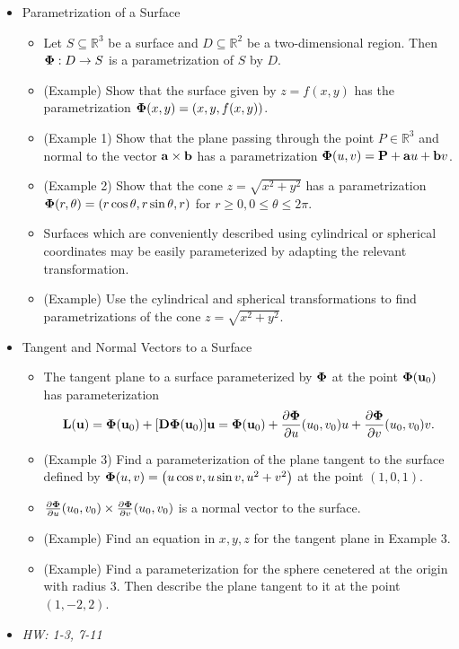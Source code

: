 \documentclass[11pt]{article}
\begin{document}
\begin{itemize}
  \item Parametrization of a Surface
    \begin{itemize}
      \item Let \(S\subseteq \mathbb R^3\) be a surface and
            \(D\subseteq \mathbb R^2\)
            be a two-dimensional region. Then \(\mathbf{\Phi}:D\to S\) is a parametrization
            of \(S\) by \(D\).
      \item (Example) Show that the surface given by \(z=f(x,y)\)
            has the parametrization \(\mathbf{\Phi}(x,y)=\left(x,y,f(x,y)\right)\).
      \item (Example 1) Show that the plane passing through the point
            \(P\in\mathbb R^3\)
            and normal to the vector \(\mathbf{a}\times\mathbf{b}\) has a parametrization
            \(\mathbf{\Phi}(u,v)=\mathbf{P}+\mathbf{a}u+\mathbf{b}v\).
      \item (Example 2) Show that the cone \(z=\sqrt{x^2+y^2}\) has a
            parametrization \(\mathbf{\Phi}(r,\theta)=\left(r\cos\theta,r\sin\theta,r\right)\)
            for \(r\geq 0,0\leq\theta\leq2\pi\).
      \item Surfaces which are conveniently described using cylindrical
            or spherical coordinates may be easily parameterized by adapting
            the relevant transformation.
      \item (Example) Use the cylindrical and spherical transformations to
            find parametrizations of the cone \(z=\sqrt{x^2+y^2}\).
    \end{itemize}
  \item Tangent and Normal Vectors to a Surface
    \begin{itemize}
      \item The tangent plane to a surface parameterized by \(\mathbf{\Phi}\)
            at the point \(\mathbf{\Phi}(\mathbf{u}_0)\) has parameterization
            \[
              \mathbf{L}(\mathbf{u})
                =
              \mathbf{\Phi}(\mathbf{u}_0)+[\mathbf{D}\mathbf{\Phi}(\mathbf{u}_0)]\mathbf{u}
                =
              \mathbf{\Phi}(\mathbf{u}_0)
                +
              \frac{\partial\mathbf{\Phi}}{\partial u}(u_0,v_0) u
                +
              \frac{\partial\mathbf{\Phi}}{\partial v}(u_0,v_0) v
            .\]
      \item (Example 3) Find a parameterization of the plane tangent
            to the surface defined by
            \(\mathbf{\Phi}(u,v)=\left(u\cos v,u\sin v,u^2+v^2\right)\) at the point
            \((1,0,1)\).
      \item \(\frac{\partial\mathbf{\Phi}}{\partial u}(u_0,v_0)
            \times \frac{\partial\mathbf{\Phi}}{\partial v}(u_0,v_0)\)
            is a normal vector to the surface.
      \item (Example) Find an equation in \(x,y,z\) for the tangent plane
            in Example 3.
      \item (Example) Find a parameterization for the sphere cenetered at
            the origin with radius \(3\). Then describe the plane tangent
            to it at the point \((1,-2,2)\).
    \end{itemize}
  \item\textit{
    HW: 1-3, 7-11
  }
\end{itemize}
\end{document}
